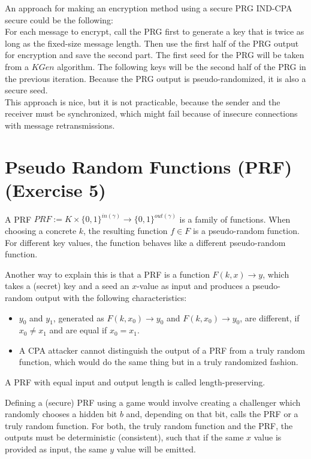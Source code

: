 An approach for making an encryption method using a secure PRG IND-CPA secure could be the following:\\
For each message to encrypt, call the PRG first to generate a key that is twice as long as the fixed-size message length. Then use the first half of the PRG output for encryption and save the second part. The first seed for the PRG will be taken from a $KGen$ algorithm. The following keys will be the second half of the PRG in the previous iteration. Because the PRG output is pseudo-randomized, it is also a secure seed.\\
This approach is nice, but it is not practicable, because the sender and the receiver must be synchronized, which might fail because of insecure connections with message retransmissions.

\section{Pseudo Random Functions (PRF) (Exercise 5)}

A PRF $PRF :=  K \times \{0,1\}^{in(\gamma)} \rightarrow \{0,1\}^{out(\gamma)}$ is a family of functions. When choosing a concrete $k$, the resulting function $f \in F$ is a pseudo-random function. For different key values, the function behaves like a different pseudo-random function.

Another way to explain this is that a PRF is a function $F(k,x) \rightarrow y$, which takes a (secret) key and a seed an $x$-value as input and produces a pseudo-random output with the following characteristics:

\begin{itemize}
    \item $y_0$ and $y_1$, generated as $F(k,x_0) \rightarrow y_0$ and $F(k,x_0) \rightarrow y_0$, are different, if $x_0 \neq x_1$ and are equal if $x_0 = x_1$.
    \item A CPA attacker cannot distinguish the output of a PRF from a truly random function, which would do the same thing but in a truly randomized fashion.
\end{itemize}

A PRF with equal input and output length is called length-preserving.

Defining a (secure) PRF using a game would involve creating a challenger which randomly chooses a hidden bit $b$ and, depending on that bit, calls the PRF or a truly random function. For both, the truly random function and the PRF, the outputs must be deterministic (consistent), such that if the same $x$ value is provided as input, the same $y$ value will be emitted.

